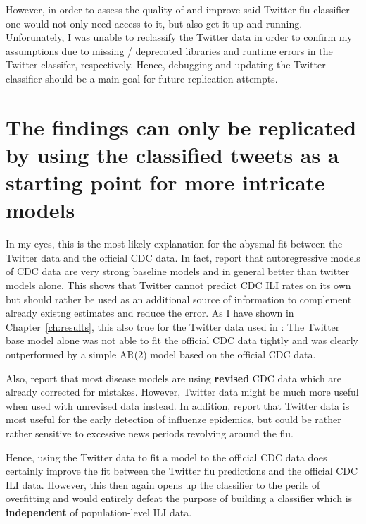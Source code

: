 \documentclass[11pt, a4paper]{report}\usepackage[]{graphicx}\usepackage[]{color}
\begin{document}
However, in order to assess the quality of and improve said Twitter flu classifier one would not only need access to it, but also get it up and running. Unforunately, I was unable to reclassify the Twitter data in order to confirm my assumptions due to missing / deprecated libraries and runtime errors in the Twitter classifer, respectively. Hence, debugging and updating the Twitter classifier should be a main goal for future replication attempts.\newline

\section{The findings can only be replicated by using the classified tweets as a starting point for more intricate models}
In my eyes, this is the most likely explanation for the abysmal fit between the Twitter data and the official CDC data. In fact, \citep{paul_worldwide_2015} report that autoregressive models of CDC data are very strong baseline models and in general better than twitter models alone. This shows that Twitter cannot predict CDC ILI rates on its own but should rather be used as an additional source of information to complement already existng estimates and reduce the error. As I have shown in Chapter~\ref{ch:results}, this also true for the Twitter data used in \citep{bodnar_data_2015}: The Twitter base model alone was not able to fit the official CDC data tightly and was clearly outperformed by a simple AR(2) model based on the official CDC data. \newline

Also, \citep{paul_twitter_2014} report that most disease models are using \textbf{revised} CDC data which are already corrected for mistakes. However, Twitter data might be much more useful when used with unrevised data instead. In addition, \citep{aramaki_twitter_2011} report that Twitter data is most useful for the early detection of influenze epidemics, but could be rather rather sensitive to excessive news periods revolving around the flu.\newline

Hence, using the Twitter data to fit a model to the official CDC data does certainly improve the fit between the Twitter flu predictions and the official CDC ILI data. However, this then again opens up the classifier to the perils of overfitting and would entirely defeat the purpose of building a classifier which is \textbf{independent} of population-level ILI data. \newline
\end{document}
